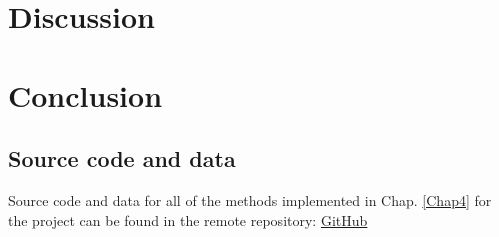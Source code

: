 \documentclass[12pt, a4paper]{report}
\begin{document}
\chapter{Discussion} \label{Chap6}
\chapter{Conclusion} \label{Chap7}


\renewcommand{\bibname}{References}

%

\begin{appendices}
\chapter{Source code and data} \label{Source_Code}
Source code and data for all of the methods implemented in Chap. \ref{Chap4} for the project can be found in the remote repository: \href{https://github.com/rpoandres/MSc_USS_Dissertation}{GitHub}







\end{appendices}
\clearpage
\printglossaries

\end{document}
